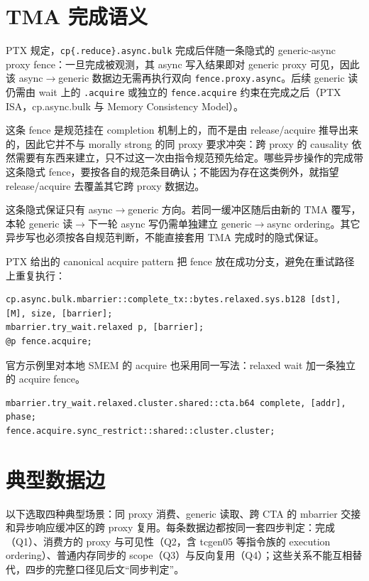 \section{TMA 完成语义}

PTX 规定，\lstinline|cp{.reduce}.async.bulk| 完成后伴随一条隐式的 generic-async proxy fence：一旦完成被观测，其 async 写入结果即对 generic proxy 可见，因此该 async$\rightarrow$generic 数据边无需再执行双向 \lstinline|fence.proxy.async|。后续 generic 读仍需由 wait 上的 \lstinline|.acquire| 或独立的 \lstinline|fence.acquire| 约束在完成之后（PTX ISA，cp.async.bulk 与 Memory Consistency Model）。

这条 fence 是规范挂在 completion 机制上的，而不是由 release/acquire 推导出来的，因此它并不与 morally strong 的同 proxy 要求冲突：跨 proxy 的 causality 依然需要有东西来建立，只不过这一次由指令规范预先给定。哪些异步操作的完成带这条隐式 fence，要按各自的规范条目确认；不能因为存在这类例外，就指望 release/acquire 去覆盖其它跨 proxy 数据边。

这条隐式保证只有 async$\rightarrow$generic 方向。若同一缓冲区随后由新的 TMA 覆写，本轮 generic 读$\rightarrow$下一轮 async 写仍需单独建立 generic$\rightarrow$async ordering。其它异步写也必须按各自规范判断，不能直接套用 TMA 完成时的隐式保证。

PTX 给出的 canonical acquire pattern 把 fence 放在成功分支，避免在重试路径上重复执行：

\begin{lstlisting}
cp.async.bulk.mbarrier::complete_tx::bytes.relaxed.sys.b128 [dst], [M], size, [barrier];
mbarrier.try_wait.relaxed p, [barrier];
@p fence.acquire;
\end{lstlisting}

官方示例里对本地 SMEM 的 acquire 也采用同一写法：relaxed wait 加一条独立的 acquire fence。

\begin{lstlisting}
mbarrier.try_wait.relaxed.cluster.shared::cta.b64 complete, [addr], phase;
fence.acquire.sync_restrict::shared::cluster.cluster;
\end{lstlisting}

\section{典型数据边}

以下选取四种典型场景：同 proxy 消费、generic 读取、跨 CTA 的 mbarrier 交接和异步响应缓冲区的跨 proxy 复用。每条数据边都按同一套四步判定：完成（Q1）、消费方的 proxy 与可见性（Q2，含 tcgen05 等指令族的 execution ordering）、普通内存同步的 scope（Q3）与反向复用（Q4）；这些关系不能互相替代，四步的完整口径见后文“同步判定”。

